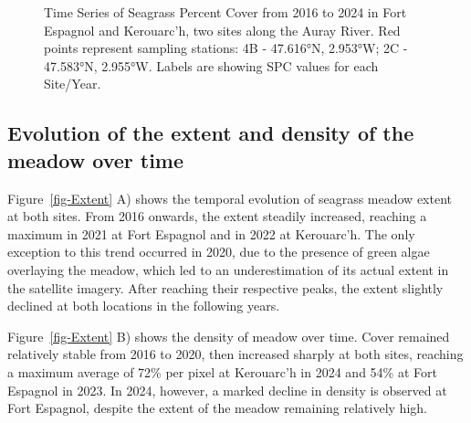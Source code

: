 \documentclass[
  number]{elsarticle}
\begin{document}
\label{cell-fig-Maps}
\begin{figure}[H]


\caption{\label{fig-Maps}Time Series of Seagrass Percent Cover from 2016
to 2024 in Fort Espagnol and Kerouarc'h, two sites along the Auray
River. Red points represent sampling stations: 4B - 47.616°N, 2.953°W;
2C - 47.583°N, 2.955°W. Labels are showing SPC values for each
Site/Year.}

\end{figure}%

\subsection{Evolution of the extent and density of the meadow over
time}\label{evolution-of-the-extent-and-density-of-the-meadow-over-time}

Figure~\ref{fig-Extent} A) shows the temporal evolution of seagrass
meadow extent at both sites. From 2016 onwards, the extent steadily
increased, reaching a maximum in 2021 at Fort Espagnol and in 2022 at
Kerouarc'h. The only exception to this trend occurred in 2020, due to
the presence of green algae overlaying the meadow, which led to an
underestimation of its actual extent in the satellite imagery. After
reaching their respective peaks, the extent slightly declined at both
locations in the following years.

Figure~\ref{fig-Extent} B) shows the density of meadow over time. Cover
remained relatively stable from 2016 to 2020, then increased sharply at
both sites, reaching a maximum average of 72\% per pixel at Kerouarc'h
in 2024 and 54\% at Fort Espagnol in 2023. In 2024, however, a marked
decline in density is observed at Fort Espagnol, despite the extent of
the meadow remaining relatively high.
\end{document}
